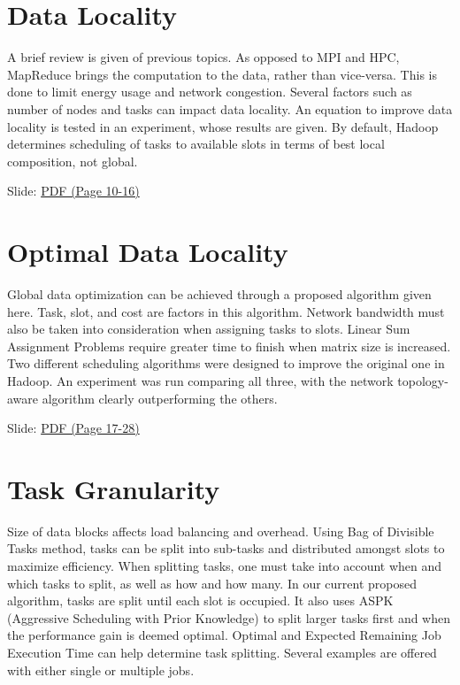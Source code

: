 
\section{Data Locality}

A brief review is given of previous topics. As opposed to MPI and HPC,
MapReduce brings the computation to the data, rather than vice-versa.
This is done to limit energy usage and network congestion. Several
factors such as number of nodes and tasks can impact data locality. An
equation to improve data locality is tested in an experiment, whose
results are given. By default, Hadoop determines scheduling of tasks to
available slots in terms of best local composition, not global.


  Slide:
  \href{https://drive.google.com/open?id=0B88HKpainTSfT28zLTdKYWhGdGM}{PDF
  (Page 10-16)}

\section{Optimal Data Locality}

Global data optimization can be achieved through a proposed algorithm
given here. Task, slot, and cost are factors in this algorithm. Network
bandwidth must also be taken into consideration when assigning tasks to
slots. Linear Sum Assignment Problems require greater time to finish
when matrix size is increased. Two different scheduling algorithms were
designed to improve the original one in Hadoop. An experiment was run
comparing all three, with the network topology-aware algorithm clearly
outperforming the others.


  Slide:
  \href{https://drive.google.com/open?id=0B88HKpainTSfT28zLTdKYWhGdGM}{PDF
  (Page 17-28)}

\section{Task Granularity}

Size of data blocks affects load balancing and overhead. Using Bag of
Divisible Tasks method, tasks can be split into sub-tasks and
distributed amongst slots to maximize efficiency. When splitting tasks,
one must take into account when and which tasks to split, as well as how
and how many. In our current proposed algorithm, tasks are split until
each slot is occupied. It also uses ASPK (Aggressive Scheduling with
Prior Knowledge) to split larger tasks first and when the performance
gain is deemed optimal. Optimal and Expected Remaining Job Execution
Time can help determine task splitting. Several examples are offered
with either single or multiple jobs.

